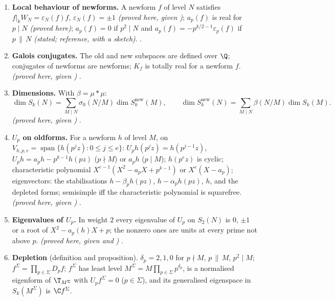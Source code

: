 \begin{enumerate}[label=\textbf{\thechapter.\arabic*}]
eigenform of $\T^{(L)}$ whose system differs from that of a newform $f$ at infinitely many $p$ is orthogonal to every $f(dz)$. \emph{(stated; reference, with a sketch;
the consequence proved here)} .
\item \textbf{Local behaviour of newforms.} A newform $f$ of level $N$ satisfies $f|_kW_N=\varepsilon_N(f)f$, $\varepsilon_N(f)=\pm1$ \emph{(proved here, given
)}; $a_p(f)$ is real for $p\mid N$ \emph{(proved here)}; $a_p(f)=0$ if $p^2\mid N$ and $a_p(f)=-p^{k/2-1}\varepsilon_p(f)$ if $p\,\|\,N$ \emph{(stated;
reference, with a sketch)}. .
\item \textbf{Galois conjugates.} The old and new subspaces are defined over $\Q$; conjugates of newforms are newforms; $K_f$ is totally real for a newform $f$. \emph{(proved
here, given )} .
\item \textbf{Dimensions.} With $\beta=\mu*\mu$:
\[
\dim S_k(N)=\sum_{M\mid N}\sigma_0(N/M)\dim S_k^{\mathrm{new}}(M),\qquad\dim S_k^{\mathrm{new}}(N)=\sum_{M\mid N}\beta(N/M)\dim S_k(M).
\] \emph{(proved
here, given )} .
\item \textbf{$U_p$ on oldforms.} For a newform $h$ of level $M$, on $V_{h,p,e}=\operatorname{span}\{h(p^jz):0\le j\le e\}$: $U_ph(p^jz)=h(p^{j-1}z)$, $U_ph=a_ph-p^{k-1}h(pz)$ ($p\nmid M$) or
$a_ph$ ($p\mid M$); $h(p^ez)$ is cyclic; characteristic polynomial $X^{e-1}(X^2-a_pX+p^{k-1})$ or $X^e(X-a_p)$; eigenvectors: the stabilisations $h-\beta_ph(pz)$, $h-\alpha_ph(pz)$,
$h$, and the depleted forms; semisimple iff the characteristic polynomial is squarefree. \emph{(proved here, given )} .
\item \textbf{Eigenvalues of $U_p$.} In weight $2$ every eigenvalue of $U_p$ on $S_2(N)$ is $0$, $\pm1$ or a root of $X^2-a_p(h)X+p$; the nonzero ones are units at every
prime not above $p$. \emph{(proved here, given  and )} .
\item \textbf{Depletion} (definition and proposition). $\delta_p=2,1,0$ for $p\nmid M$, $p\,\|\,M$, $p^2\mid M$; $f^\Sigma=\prod_{p\in\Sigma}D_pf$; $f^\Sigma$ has least level
$M^\Sigma=M\prod_{p\in\Sigma}p^{\delta_p}$, is a normalised eigenform of $\T_{M^\Sigma}$ with $U_pf^\Sigma=0$ ($p\in\Sigma$), and its generalised eigenspace in $S_k(M^\Sigma)$ is $\C f^\Sigma$.

\end{enumerate}
